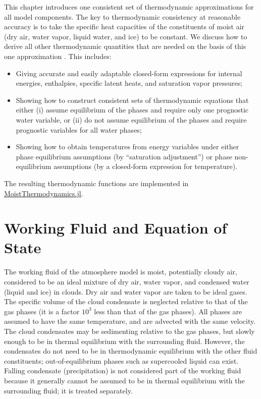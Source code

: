 \documentclass{report}
\begin{document}
This chapter introduces one consistent set of thermodynamic approximations for all model components. The key to thermodynamic consistency at reasonable accuracy is to take the specific heat capacities of the constituents of moist air (dry air, water vapor, liquid water, and ice) to be constant. We discuss how to derive all other thermodynamic quantities that are needed on the basis of this one approximation \citep[cf.][]{Romps08a,Marquet16a}. This includes: 
\begin{itemize}
    \item Giving accurate and easily adaptable closed-form expressions for internal energies, enthalpies, specific latent heats, and saturation vapor pressures;
    \item Showing how to construct consistent sets of thermodynamic equations that either (i) assume equilibrium of the phases and require only one prognostic water variable, or (ii) do not assume equilibrium of the phases and require prognostic variables for all water phases;
    \item Showing how to obtain temperatures from energy variables under either phase equilibrium assumptions (by ``saturation adjustment'') or phase non-equilibrium assumptions (by a closed-form expression for temperature).
\end{itemize}
The resulting thermodynamic functions are implemented in \href{https://github.com/climate-machine/CLIMA/tree/master/src/Common/MoistThermodynamics}{MoistThermodynamics.jl}.

\section{Working Fluid and Equation of State}

The working fluid of the atmosphere model is moist, potentially cloudy air, considered to be an ideal mixture of dry air, water vapor, and condensed water (liquid and ice) in clouds. Dry air and water vapor are taken to be ideal gases. The specific volume of the cloud condensate is neglected relative to that of the gas phases (it is a  factor $10^{3}$ less than that of the gas phases). All phases are assumed to have the same temperature, and are advected with the same velocity. The cloud condensates may be sedimenting relative to the gas phases, but slowly enough to be in thermal equilibrium with the surrounding fluid. However, the condensates do not need to be in thermodynamic equilibrium with the other fluid constituents; out-of-equilibrium phases such as supercooled liquid can exist. Falling condensate (precipitation) is not considered part of the working fluid because it generally cannot be assumed to be in thermal equilibrium with the surrounding fluid; it is treated separately.
\end{document}
